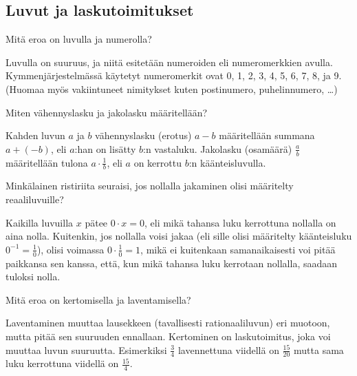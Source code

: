 \subsection*{Luvut ja laskutoimitukset}

\begin{tehtava}
Mitä eroa on luvulla ja numerolla?
\begin{vastaus}
Luvulla on suuruus, ja niitä esitetään numeroiden eli numeromerkkien avulla. Kymmenjärjestelmässä käytetyt numeromerkit ovat 0, 1, 2, 3, 4, 5, 6, 7, 8, ja 9. (Huomaa myös vakiintuneet nimitykset kuten postinumero, puhelinnumero, \ldots)
\end{vastaus}
\end{tehtava}

\begin{tehtava}
Miten vähennyslasku ja jakolasku määritellään?
\begin{vastaus}
Kahden luvun $a$ ja $b$ vähennyslasku (erotus) $a-b$ määritellään summana $a+(-b)$, eli $a$:han on lisätty $b$:n vastaluku. Jakolasku (osamäärä) $\frac{a}{b}$ määritellään tulona $a\cdot \frac1b$, eli $a$ on kerrottu $b$:n käänteisluvulla.
\end{vastaus}
\end{tehtava}

\begin{tehtava}
Minkälainen ristiriita seuraisi, jos nollalla jakaminen olisi määritelty reaaliluvuille?
\begin{vastaus}
Kaikilla luvuilla $x$ pätee $0 \cdot x = 0$, eli mikä tahansa luku kerrottuna nollalla on aina nolla. Kuitenkin, jos nollalla voisi jakaa (eli sille olisi määritelty käänteisluku $0^{-1}=\frac10$), olisi voimassa $0 \cdot\frac10 = 1$, mikä ei kuitenkaan samanaikaisesti voi pitää paikkansa sen kanssa, että, kun mikä tahansa luku kerrotaan nollalla, saadaan tuloksi nolla.
\end{vastaus}
\end{tehtava}

\begin{tehtava}
Mitä eroa on kertomisella ja laventamisella?
\begin{vastaus}
Laventaminen muuttaa lausekkeen (tavallisesti rationaaliluvun) eri muotoon, mutta pitää sen suuruuden ennallaan. Kertominen on laskutoimitus, joka voi muuttaa luvun suuruutta. Esimerkiksi $\frac34$ lavennettuna viidellä on $\frac{15}{20}$ mutta sama luku kerrottuna viidellä on $\frac{15}{4}$.
\end{vastaus}
\end{tehtava}

